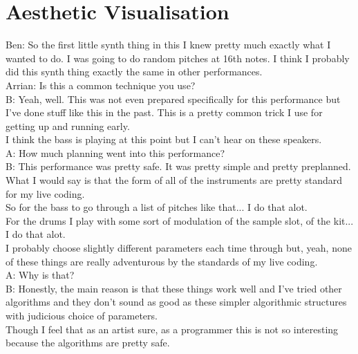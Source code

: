 
\section*{Aesthetic Visualisation}

Ben: So the first little synth thing in this I knew pretty much exactly what I wanted to do. I was going to do random pitches at 16th notes. I think I probably did this synth thing exactly the same in other performances.\\

Arrian: Is this a common technique you use?\\

B: Yeah, well. This was not even prepared specifically for this performance but I've done stuff like this in the past. This is a pretty common trick I use for getting up and running early.\\

I think the bass is playing at this point but I can't hear on these speakers.\\

A: How much planning went into this performance?\\

B: This performance was pretty safe. It was pretty simple and pretty preplanned. What I would say is that the form of all of the instruments are pretty standard for my live coding.\\

So for the bass to go through a list of pitches like that... I do that alot.\\

For the drums I play with some sort of modulation of the sample slot, of the kit... I do that alot.\\

I probably choose slightly different parameters each time through but, yeah, none of these things are really adventurous by the standards of my live coding.\\

A: Why is that?\\

B: Honestly, the main reason is that these things work well and I've tried other algorithms and they don't sound as good as these simpler algorithmic structures with judicious choice of parameters.\\

Though I feel that as an artist sure, as a programmer this is not so interesting because the algorithms are pretty safe.\\

